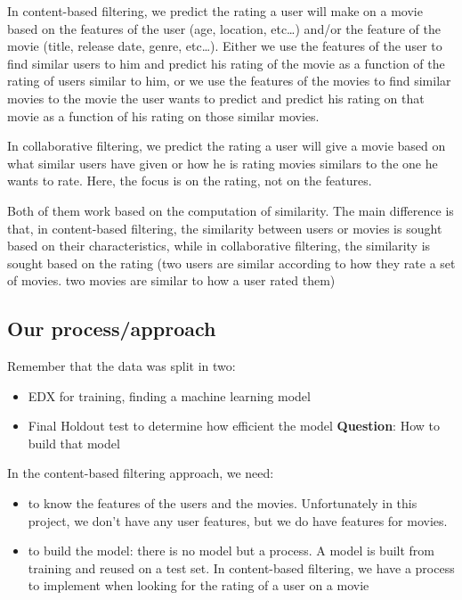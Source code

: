 \documentclass[
]{article}
\providecommand{\tightlist}{%
  \setlength{\itemsep}{0pt}\setlength{\parskip}{0pt}}
\begin{document}
In content-based filtering, we predict the rating a user will make on a
movie based on the features of the user (age, location, etc\ldots)
and/or the feature of the movie (title, release date, genre, etc\ldots).
Either we use the features of the user to find similar users to him and
predict his rating of the movie as a function of the rating of users
similar to him, or we use the features of the movies to find similar
movies to the movie the user wants to predict and predict his rating on
that movie as a function of his rating on those similar movies.

In collaborative filtering, we predict the rating a user will give a
movie based on what similar users have given or how he is rating movies
similars to the one he wants to rate. Here, the focus is on the rating,
not on the features.

Both of them work based on the computation of similarity. The main
difference is that, in content-based filtering, the similarity between
users or movies is sought based on their characteristics, while in
collaborative filtering, the similarity is sought based on the rating
(two users are similar according to how they rate a set of movies. two
movies are similar to how a user rated them)

\subsection{Our process/approach}\label{our-processapproach}

Remember that the data was split in two:

\begin{itemize}
\tightlist
\item
  EDX for training, finding a machine learning model
\item
  Final Holdout test to determine how efficient the model
  \textbf{Question}: How to build that model
\end{itemize}

In the content-based filtering approach, we need:

\begin{itemize}
\tightlist
\item
  to know the features of the users and the movies. Unfortunately in
  this project, we don't have any user features, but we do have features
  for movies.
\item
  to build the model: there is no model but a process. A model is built
  from training and reused on a test set. In content-based filtering, we
  have a process to implement when looking for the rating of a user on a
  movie
\end{itemize}
\end{document}
